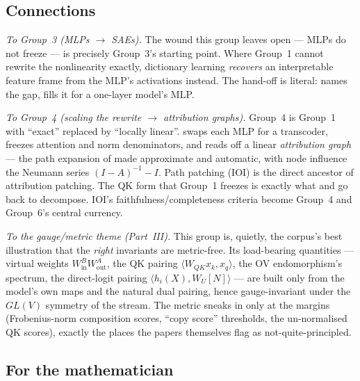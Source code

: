 \subsection*{Connections}

\emph{To Group~3 (MLPs $\to$ SAEs).} The wound this group leaves open --- MLPs do not freeze --- is precisely Group~3's starting point. Where Group~1 cannot rewrite the nonlinearity exactly, dictionary learning \emph{recovers} an interpretable feature frame from the MLP's activations instead. The hand-off is literal: \textcite{framework} names the gap, \textcite{towards-monosemanticity} fills it for a one-layer model's MLP.

\emph{To Group~4 (scaling the rewrite $\to$ attribution graphs).} Group~4 is Group~1 with ``exact'' replaced by ``locally linear''. \textcite{circuit-tracing-computational-graphs} swaps each MLP for a transcoder, freezes attention and norm denominators, and reads off a linear \emph{attribution graph} --- the path expansion of \textcite{framework} made approximate and automatic, with node influence the Neumann series $(I-A)^{-1}-I$. Path patching (IOI) is the direct ancestor of attribution patching. The QK form that Group~1 freezes is exactly what \textcite{tracing-attention-feature-interactions} and \textcite{progress-on-attention} go back to decompose. IOI's faithfulness/completeness criteria become Group~4 and Group~6's central currency.

\emph{To the gauge/metric theme (Part~III).} This group is, quietly, the corpus's best illustration that the \emph{right} invariants are metric-free. Its load-bearing quantities --- virtual weights $W_{\mathrm{in}}^{B}W_{\mathrm{out}}^{A}$, the QK pairing $\langle W_{QK}x_k,x_q\rangle$, the OV endomorphism's spectrum, the direct-logit pairing $\langle h_i(X),W_U[N]\rangle$ --- are built only from the model's own maps and the natural dual pairing, hence gauge-invariant under the $GL(V)$ symmetry of the stream. The metric sneaks in only at the margins (Frobenius-norm composition scores, ``copy score'' thresholds, the un-normalised QK scores), exactly the places the papers themselves flag as not-quite-principled.

\subsection*{For the mathematician}

